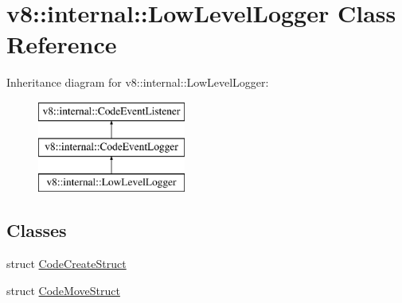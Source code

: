 \hypertarget{classv8_1_1internal_1_1_low_level_logger}{}\section{v8\+:\+:internal\+:\+:Low\+Level\+Logger Class Reference}
\label{classv8_1_1internal_1_1_low_level_logger}
Inheritance diagram for v8\+:\+:internal\+:\+:Low\+Level\+Logger\+:\begin{figure}[H]
\begin{center}
\leavevmode
\includegraphics[height=3.000000cm]{classv8_1_1internal_1_1_low_level_logger}
\end{center}
\end{figure}
\subsection*{Classes}
\begin{DoxyCompactItemize}
\item 
struct \hyperlink{structv8_1_1internal_1_1_low_level_logger_1_1_code_create_struct}{Code\+Create\+Struct}
\item 
struct \hyperlink{structv8_1_1internal_1_1_low_level_logger_1_1_code_move_struct}{Code\+Move\+Struct}
\end{DoxyCompactItemize}
